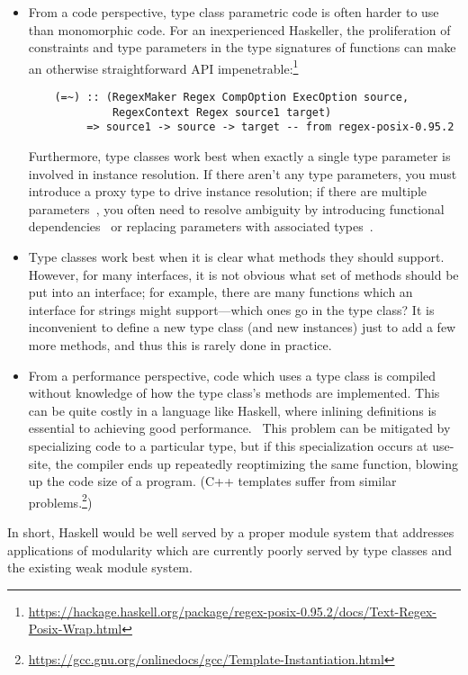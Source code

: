 \begin{itemize}
    \item From a code perspective, type class parametric code is often
    harder to use than monomorphic code.  For an inexperienced
    Haskeller, the proliferation of constraints and type parameters in the
    type signatures of functions can make an otherwise straightforward
    API impenetrable:\footnote{\url{https://hackage.haskell.org/package/regex-posix-0.95.2/docs/Text-Regex-Posix-Wrap.html}}
    \begin{lstlisting}
    (=~) :: (RegexMaker Regex CompOption ExecOption source,
             RegexContext Regex source1 target)
         => source1 -> source -> target -- from regex-posix-0.95.2
    \end{lstlisting}
    Furthermore, type classes work best when exactly a single type
    parameter is involved in instance resolution. If there aren't any type
    parameters, you must introduce a proxy type to drive instance resolution; if
    there are multiple parameters~\cite{lfp92}, you often need to resolve ambiguity
    by introducing functional
    dependencies~\cite{Jones:2000:TCF:645394.651909} or replacing
    parameters with associated types~\cite{towards-open-type-functions-haskell}.

    \item Type classes work best when it is clear what methods they
    should support.  However, for many interfaces, it is not obvious
    what set of methods should be put into an interface; for example,
    there are many functions which an interface for strings might
    support---which ones go in the type class?  It is inconvenient
    to define a new type class (and new instances) just to add a
    few more methods, and thus this is rarely done in practice.

    \item From a performance perspective, code which uses a type class
    is compiled without knowledge of how the type class's
    methods are implemented.  This can be quite costly in a language
    like Haskell, where inlining definitions is essential to achieving
    good performance.~\cite{PeytonJones:2002:SGH:968417.968422}  This problem can
    be mitigated by specializing code to a particular type, but if this
    specialization occurs at use-site, the compiler ends up repeatedly reoptimizing
    the same function, blowing up the code size of
    a program. (C++ templates suffer from similar problems.\footnote{\url{https://gcc.gnu.org/onlinedocs/gcc/Template-Instantiation.html}})
\end{itemize}
%
In short, Haskell would be well served by a proper module system that
addresses applications of modularity which are currently poorly served
by type classes and the existing weak module system.

